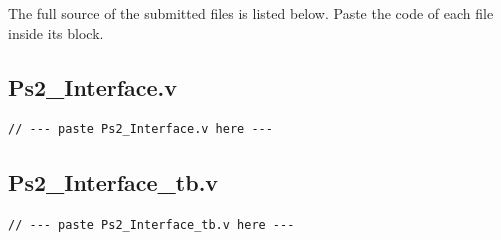 \documentclass[11pt,a4paper]{article}
\begin{document}
The full source of the submitted files is listed below. Paste the code of each
file inside its block.

\subsection*{Ps2\_Interface.v}
\begin{lstlisting}
// --- paste Ps2_Interface.v here ---
\end{lstlisting}

\newpage
\subsection*{Ps2\_Interface\_tb.v}
\begin{lstlisting}
// --- paste Ps2_Interface_tb.v here ---
\end{lstlisting}

\newpage
\end{document}
